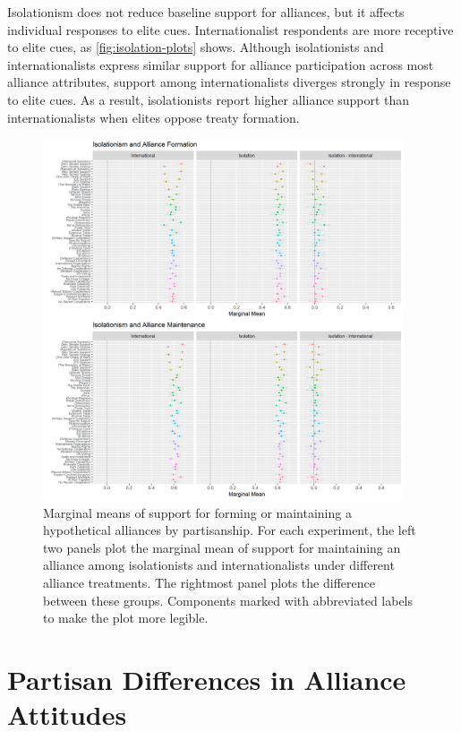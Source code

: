 \documentclass[12pt]{article}
\begin{document}
Isolationism does not reduce baseline support for alliances, but it affects individual responses to elite cues. 
Internationalist respondents are more receptive to elite cues, as \autoref{fig:isolation-plots} shows. 
Although isolationists and internationalists express similar support for alliance participation across most alliance attributes, support among internationalists diverges strongly in response to elite cues. 
As a result, isolationists report higher alliance support than internationalists when elites oppose treaty formation. 


\begin{figure}
	\centering
		\includegraphics[width=0.95\textwidth]{isolation-plots.png}
	\caption{Marginal means of support for forming or maintaining a hypothetical alliances by partisanship. For each experiment, the left two panels plot the marginal mean of support for maintaining an alliance among isolationists and internationalists under different alliance treatments. The rightmost panel plots the difference between these groups. Components marked with abbreviated labels to make the plot more legible.}
	\label{fig:isolation-plots}
\end{figure}



\section{Partisan Differences in Alliance Attitudes}
\end{document}
